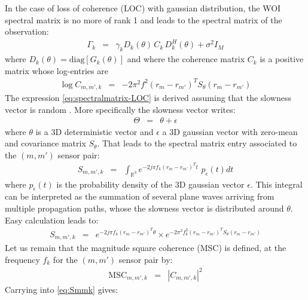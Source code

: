 \documentclass[graybox]{svmult/styles/svmult}
\def\msc{\mathrm{MSC}}
\newcommand{\diag}[1]{\mathrm{diag}\left[ #1 \right]}
\begin{document}
In the case of  loss of coherence (LOC) with gaussian distribution, the WOI spectral matrix is no more of rank 1 and leads to the spectral matrix of the observation: 
 \begin{eqnarray}
 \label{eq:spectralmatrix-LOC}
 \Gamma_{k}&=&\gamma_{k}D_{k}(\theta)\,C_{k}\,D^{H}_{k}(\theta)+\sigma^{2}I_{M}
 \end{eqnarray}
where $D_{k}(\theta)=\diag{G_{k}(\theta)}$ and where the coherence matrix $C_{k}$ is a positive matrix whose  log-entries are
\begin{eqnarray}
 \label{eq:spectralmatrix-LOC}
 \log C_{m,m',k}&=&-2\pi^2f^2(r_{m}-r_{m'})^TS_{\theta}(r_{m}-r_{m'})
\end{eqnarray}
The expression \eqref{eq:spectralmatrix-LOC} is derived assuming that the slowness vector is random \cite{nouvellet_itwb:2013}. More specifically the slowness vector writes:
\begin{eqnarray*}
\Theta &=& \theta+\epsilon
\end{eqnarray*}
where $\theta$ is a 3D deterministic vector and $\epsilon$ a 3D gaussian vector with zero-mean and covariance matrix $S_{\theta}$. That leads to the spectral matrix entry associated to the $(m,m')$ sensor pair:
\begin{eqnarray*}
S_{m,m',k} &=& \int_{\mathds{R}^3}e^{-2j\pi f_{k} (r_{m}-r_{m'})^{T}t} \,\, p_{\epsilon}(t)
dt
\end{eqnarray*}
where $p_{\epsilon}(t)$ is the probability density of the 3D gaussian vector $\epsilon$. 
This integral can be interpreted as the summation of several plane waves arriving from multiple propagation paths, whose the slowness vector is distributed around $\theta$. Easy calculation leads to:
\begin{eqnarray}
\label{eq:Smmk}
S_{m,m',k}
&=&
e^{-2j\pi f_{k} (r_{m}-r_{m'})^T\theta}\times
e^{-2\pi^2f_{k}^2 (r_{m}-r_{m'})^TS_{\theta}(r_{m}-r_{m'})}
\end{eqnarray}
Let us remain that
the magnitude square coherence (MSC) is defined, at the frequency $f_{k}$ for the  $(m,m')$ sensor pair by:
\begin{eqnarray*}
 \msc_{m,m',k}&=& \left |
 C_{m,m',k}
 \right |^{2}
\end{eqnarray*}
Carrying into \eqref{eq:Smmk} gives:
\end{document}
